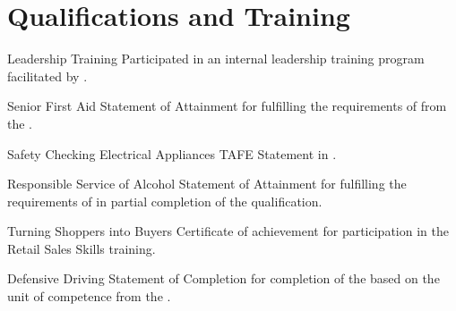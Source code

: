 \documentclass[10pt]{article}
\begin{document}
%
\section*{Qualifications and Training}
\begin{qualifications}

{Leadership Training}
{Participated in an internal leadership training program facilitated by 
.}

{Senior First Aid}
{Statement of Attainment for fulfilling the requirements of 
 from the 
.}

{Safety Checking Electrical Appliances}
{TAFE Statement in .}

{Responsible Service of Alcohol}
{Statement of Attainment for fulfilling the requirements of 
 in 
partial completion of the  qualification.}

{Turning Shoppers into Buyers}
{Certificate of achievement for participation in the  
 Retail Sales Skills training.}

{Defensive Driving}
{Statement of Completion for completion of the  based on the unit of competence 
 from the 
.}

\end{qualifications}

\end{document}
